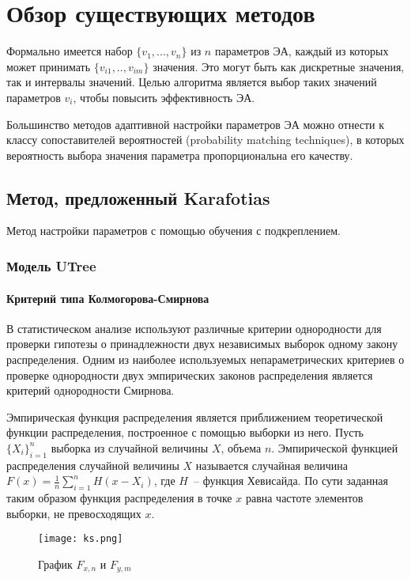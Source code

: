 \chapter{Обзор существующих методов}
\label{chapter_review}

Формально имеется набор $\{v_1, ..., v_n\}$ из $n$ параметров ЭА, каждый из которых может принимать $\{v_{i1}, .., v_{im}\}$ значения. Это могут быть как дискретные значения, так и интервалы значений. Целью алгоритма является выбор таких значений параметров $v_i$, чтобы повысить эффективность ЭА.

Большинство методов адаптивной настройки параметров ЭА можно отнести к классу сопоставителей вероятностей (probability matching techniques), в которых вероятность выбора значения параметра пропорциональна его качеству.

\section{Метод, предложенный Karafotias}
Метод настройки параметров с помощью обучения с подкреплением.

\subsection{Модель UTree}

\subsubsection{Критерий типа Колмогорова-Смирнова}
\label{kolmogorov_smirnov_criteria}
В статистическом анализе используют различные критерии однородности для проверки гипотезы о принадлежности двух независимых выборок одному закону распределения. Одним из наиболее используемых непараметрических критериев о проверке однородности двух эмпирических законов распределения является критерий однородности Смирнова. 

Эмпирическая функция распределения является приближением теоретической функции распределения, построенное с помощью выборки из него. Пусть $\{X_i\}_{i = 1}^n$ выборка из случайной величины $X$, объема $n$. Эмпирической функцией распределения случайной величины $X$ называется случайная величина $F(x) = \frac{1}{n}\sum\limits_{i = 1}^n{H(x - X_i)}$, где $H$~-- функция Хевисайда. По сути заданная таким образом функция распределения в точке $x$ равна частоте элементов выборки, не превосходящих $x$.

\begin{figure}
    \centering
    \texttt{[image: ks.png]}
    \caption{График $F_{x, n}$ и $F_{y, m}$}
    \label{ks}
\end{figure}

